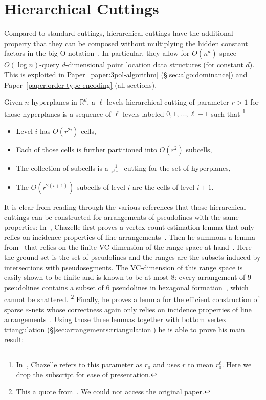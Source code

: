 \section{Hierarchical Cuttings}%
\label{sec:divide-and-conquer:hierarchical-cuttings}

Compared to standard cuttings, hierarchical cuttings
have the additional property that they can be composed without multiplying the
hidden constant factors in the big-O notation~\cite{C93}.
%
In particular, they allow for \(O(n^d)\)-space \(O(\log n)\)-query
\(d\)-dimensional point location data structures (for constant \(d\)).
%
This is exploited in Paper~\ref{paper:3pol-algorithm}
(\S\ref{sec:algo:dominance}) and Paper~\ref{paper:order-type-encoding} (all
sections).

\begin{definition}
  Given \(n\) hyperplanes in \(\mathbb{R}^d\),
  a \(\ell\)-levels hierarchical cutting of parameter \(r > 1\)
  for those hyperplanes
  is a sequence of \(\ell\) levels labeled \(0,1, \ldots, \ell - 1\)
  such that%
  \footnote{In~\cite{C93}, Chazelle refers to this parameter as
  \(r_0\) and uses \(r\) to mean \(r_0^\ell\). Here we drop the subscript for
  ease of presentation.}
  \begin{itemize}
    \item Level \(i\) has \(O(r^{2i})\) cells,
    \item Each of those cells is further partitioned into \(O(r^2)\)
      subcells,
    \item The collection of subcells is a \(\frac{1}{r^{i+1}}\)-cutting for
      the set of hyperplanes,
    \item The \(O(r^{2(i+1)})\) subcells of level \(i\) are the cells of level \(i+1\).
  \end{itemize}
\end{definition}
%
It is clear from reading through the various references that those
hierarchical cuttings can be constructed for arrangements of pseudolines with
the same properties:
In~\cite{C93},
Chazelle first proves a vertex-count estimation lemma
that only relies on incidence properties of line
arrangements~\cite[Lemma~2.1]{C93}. Then he summons a lemma from~\cite{Ma93}
that relies on the finite VC-dimension of the range space at
hand~\cite[Lemma~3.1]{C93}.
Here the ground set is the set of pseudolines and the ranges are the
subsets induced by intersections with pseudosegments.
The VC-dimension of this range space
is easily shown to be finite and is known to be at most
\(8\): every arrangement of \(9\) pseudolines contains a subset of
\(6\) pseudolines in hexagonal formation~\cite{HM94}, which cannot be
shattered.%
\footnote{This a quote from~\cite{BMP05}. We could not access
the original paper.}
%
Finally, he proves a lemma for the efficient construction of
sparse \(\varepsilon\)-nets whose correctness again only relies on incidence
properties of line arrangements~\cite[Lemma 3.2]{C93}.
Using those three lemmas together with bottom vertex triangulation
(\S\ref{sec:arrangements:triangulation})
he is
able to prove his main result:

